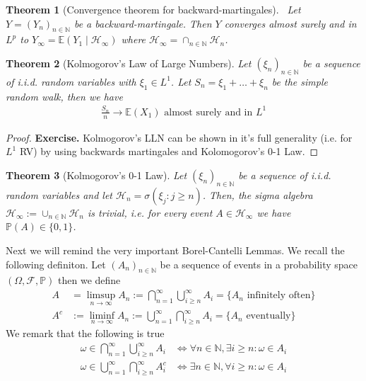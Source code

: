 \documentclass[11pt,a4paper, final]{article}
\newtheorem{thm}{Theorem}[section]
\theoremstyle{definition}
\begin{document}
\begin{thm}[Convergence theorem for backward-martingales] \ \newline Let $Y=(Y_n)_{n \in \mathbb{N}}$ be a backward-martingale. Then $Y$ converges almost surely and in $L^p$ to $Y_\infty = \mathbb{E}(Y_1 \mid \mathcal{H}_\infty )$ where $\mathcal{H}_\infty = \cap_{n \in \mathbb{N}} \mathcal{H}_n$. 
\end{thm}
\begin{thm}[Kolmogorov's Law of Large Numbers] Let $(\xi_n)_{n \in \mathbb{N}}$ be a sequence of i.i.d. random variables with $\xi_1 \in L^1$. Let $S_n = \xi_1 + \dots + \xi_n$ be the simple random walk, then we have
\begin{align*}
\frac{S_n}{n} \to \mathbb{E}(X_1) \text{ almost surely and in } L^1
\end{align*}
\end{thm}
\begin{proof}
\textbf{Exercise.} Kolmogorov's LLN can be shown in it's full generality (i.e. for $L^1$ RV) by using backwards martingales and Kolomogorov's 0-1 Law. 
\end{proof}
\begin{thm}[Kolmogorov's 0-1 Law] Let $(\xi_n)_{n \in \mathbb{N}}$ be a sequence of i.i.d. random variables and let $\mathcal{H}_n = \sigma( \xi_j : j \geq n )$. Then, the sigma algebra $\mathcal{H}_\infty := \cup_{n \in \mathbb{N}} \mathcal{H}_n$ is trivial, i.e. for every event $A \in \mathcal{H}_\infty$ we have  \\ $\mathbb{P}(A) \in \lbrace 0 ,1 \rbrace$. 
\end{thm}
\noindent Next we will remind the very important Borel-Cantelli Lemmas. We recall the following definiton. Let $(A_n)_{n \in \mathbb{N}}$ be a sequence of events in a probability space $( \Omega, \mathcal{F}, \mathbb{P})$ then we define 
\begin{align*}
A & = \limsup_{n \to \infty} A_n:= \bigcap_{n=1}^\infty \bigcup_{i \geq n}^\infty A_i = \lbrace A_n \text{ infinitely often} \rbrace  
\\
A^c &:= \liminf_{n \to \infty} A_n := \bigcup_{n=1}^\infty \bigcap_{i \geq n }^\infty A_i = \lbrace A_n \text{ eventually} \rbrace 
\end{align*}
We remark that the following is true
\begin{align*}
\omega \in \bigcap_{n=1}^\infty \bigcup_{i \geq n}^\infty A_i &\iff \forall n \in \mathbb{N}, \exists i \geq n : \omega \in A_i   \\
\omega \in \bigcup_{n=1}^\infty \bigcap_{i \geq n }^\infty A_i^c &\iff \exists n \in \mathbb{N}, \forall i \geq n : \omega \in A_i
\end{align*}
\end{document}
